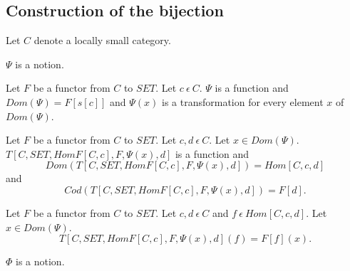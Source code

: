 \documentclass{article}
\newcommand{\inn}{~\epsilon~}
\newcommand{\innn}{~\epsilon~} %
\begin{document}
	\subsection{Construction of the bijection}
	\begin{forthel}
		
		Let $C$ denote a locally small category.
	
		\begin{signature}
			$\Psi$ is a notion.
		\end{signature}
		
		\begin{axiom}
			Let $F$ be a functor from $C$ to $SET$. Let $c \innn C$. $\Psi$ is a function and
			$Dom(\Psi) = F[s[c]]$ and $\Psi(x)$ is a transformation for every element $x$ of $Dom(\Psi)$.
		\end{axiom}
		
		\begin{axiom} 
			Let $F$ be a functor from $C$ to $SET$. 
			Let $c,d \innn C$.
			Let $x \in Dom(\Psi)$. 
			$T[C,SET,HomF[C,c],F,\Psi(x),d]$ is a function and
			$$Dom(T[C,SET,HomF[C,c],F,\Psi(x),d]) = Hom[C,c,d]$$ and 
			$$Cod(T[C,SET,HomF[C,c],F,\Psi(x),d]) = F[d].$$
		\end{axiom}
		
		\begin{axiom}[PsiDef]
			Let $F$ be a functor from $C$ to $SET$. 
			Let $c,d \innn C$ and $f\innn Hom[C,c,d].$
			Let $x \in Dom(\Psi)$. $$T[C,SET,HomF[C,c],F,\Psi(x),d](f) = F[f](x).$$
		\end{axiom}
		


		\begin{signature} $\Phi$ is a notion.
		\end{signature}
		

\end{forthel}
\end{document}
